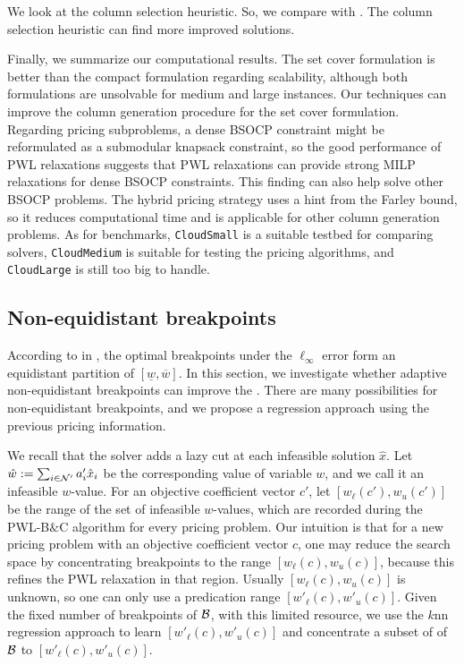 We look at the column selection heuristic. So, we compare  \dwhybrid with \dwhybrids. The column selection heuristic can find more improved solutions.

Finally, we summarize our computational results. The set cover formulation is better than the compact formulation regarding scalability, although both formulations are unsolvable for medium and large instances. Our techniques can improve the column generation procedure  for the set cover formulation. Regarding pricing subproblems, a dense BSOCP constraint might be reformulated as a submodular knapsack constraint, so the good performance of PWL relaxations  suggests that PWL relaxations can provide strong MILP relaxations for dense BSOCP constraints. This finding can also help solve other BSOCP problems. The hybrid pricing strategy uses a hint from the Farley bound, so it reduces computational time and is applicable for other column generation problems. As for benchmarks, \texttt{CloudSmall} is a suitable testbed for comparing solvers, \texttt{CloudMedium} is suitable for testing the pricing algorithms, and \texttt{CloudLarge} is still too big to handle.


\subsection*{Non-equidistant breakpoints}
\label{sec.effect}

According to  in , the optimal breakpoints under the $\ell_\infty$ error  form an equidistant partition of $[\underline{w}, \overline{w}]$. In this section, we investigate whether adaptive non-equidistant breakpoints can improve the \dwpwl. There are many possibilities for non-equidistant breakpoints, and we propose a regression approach using the previous pricing information.

We recall that the \dwpwl solver adds a lazy cut at  each infeasible solution $\hat{x}$. Let $\hat{w} := \sum_{i \in \mathcal N'} a'_i \hat{x}_i$ be the corresponding value of variable $w$, and we call it an infeasible $w$-value. For an objective coefficient vector $c'$, let $[w_{\ell}(c'),w_{u}(c')]$ be the range of the set of infeasible $w$-values, which are recorded  during the PWL-B$\&$C algorithm for every pricing problem. Our intuition is that for a new pricing problem with an  objective coefficient vector $c$,  one may reduce the search space by concentrating breakpoints  to the range $[w_{\ell}(c),w_{u}(c)]$, because this  refines the PWL relaxation in that region. Usually $[w_{\ell}(c),w_{u}(c)]$ is unknown, so one can only use a predication range $[w'_{\ell}(c), w'_{u}(c)]$. Given the fixed number of breakpoints of $\mathcal B$, with this limited resource, we use the $k$nn regression approach to learn $[w'_{\ell}(c), w'_{u}(c)]$ and  concentrate a subset of of $\mathcal B$ to $[w'_{\ell}(c), w'_{u}(c)]$.



